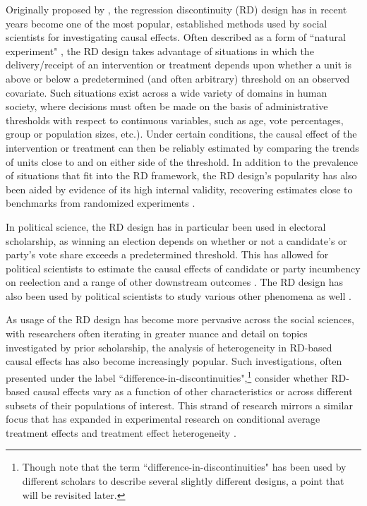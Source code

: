 \documentclass[12pt]{article}
\begin{document}
Originally proposed by \cite{thistlethwaite1960regression}, the regression discontinuity (RD) design has in recent years become one of the most popular, established methods used by social scientists for investigating causal effects. Often described as a form of ``natural experiment" \citep{dunning2012natural, titiunik2021natural}, the RD design takes advantage of situations in which the delivery/receipt of an intervention or treatment depends upon whether a unit is above or below a predetermined (and often arbitrary) threshold on an observed covariate. Such situations exist across a wide variety of domains in human society, where decisions must often be made on the basis of administrative thresholds with respect to continuous variables, such as age, vote percentages, group or population sizes, etc.). Under certain conditions, the causal effect of the intervention or treatment can then be reliably estimated by comparing the trends of units close to and on either side of the threshold. In addition to the prevalence of situations that fit into the RD framework, the RD design's popularity has also been aided by evidence of its high internal validity, recovering estimates close to benchmarks from randomized experiments \citep[e.g.][]{cook2008empirical, chaplin2018internal}.

In political science, the RD design has in particular been used in electoral scholarship, as winning an election depends on whether or not a candidate's or party's vote share exceeds a predetermined threshold. This has allowed for political scientists to estimate the causal effects of candidate or party incumbency on reelection and a range of other downstream outcomes \citep{eggers2015validity}. The RD design has also been used by political scientists to study various other phenomena as well \citep{pettersson-lidbom2008a, gerber2011, fujiwara2011a, eggers2015, anagol2016, kaplan2019, abou-chadi2020, dunaiski2021, yoder2021a}.

As usage of the RD design has become more pervasive across the social sciences, with researchers often iterating in greater nuance and detail on topics investigated by prior scholarship, the analysis of heterogeneity in RD-based causal effects has also become increasingly popular. \citep{anderson2014, hansen2015, card2016, barrow2020, jenkins2016head}
Such investigations, often presented under the label ``difference-in-discontinuities",\footnote{Though note that the term ``difference-in-discontinuities" has been used by different scholars to describe several slightly different designs, a point that will be revisited later.} consider whether RD-based causal effects vary as a function of other characteristics or across different subsets of their populations of interest. This strand of research mirrors a similar focus that has expanded in experimental research on conditional average treatment effects and treatment effect heterogeneity \citep[see e.g.][]{gerbergreen2012, imairatkovic2013, ratkovic2017sparse, wager2018estimation, ratkovic2021subgroup}.
\end{document}
